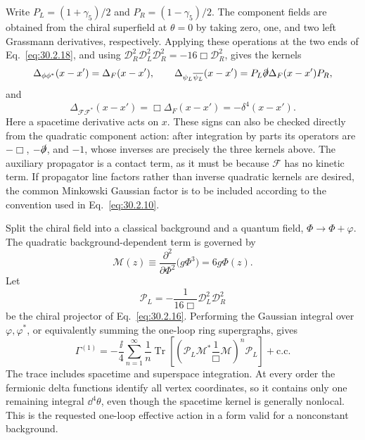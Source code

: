 \ExerciseEditorialNote

\begin{enumerate}
  Write \(P_L=(1+\gamma _5)/2\) and \(P_R=(1-\gamma _5)/2\).  The
  component fields are obtained from the chiral superfield at
  \(\theta=0\) by taking zero, one, and two left Grassmann derivatives,
  respectively.  Applying these operations at the two ends of
  Eq.~\eqref{eq:30.2.18}, and using
  \(\mathcal D_R^2\mathcal D_L^2\mathcal D_R^2
  =-16\Box\mathcal D_R^2\), gives the kernels
  \[
    \Delta_{\phi\phi^*}(x-x')=\Delta_F(x-x'),
    \qquad
    \Delta_{\psi_L\overline{\psi_L}}(x-x')
      =P_L\slashed{\partial}\Delta_F(x-x')P_R ,
  \]
  and
  \[
    \Delta_{\mathcal F\mathcal F^*}(x-x')
      =\Box\Delta_F(x-x')=-\delta^4(x-x').
  \]
  Here a spacetime derivative acts on \(x\).  These signs can also be
  checked directly from the quadratic component action: after integration
  by parts its operators are \(-\Box\), \(-\slashed{\partial}\), and
  \(-1\), whose inverses are precisely the three kernels above.  The
  auxiliary propagator is a contact term, as it must be because
  \(\mathcal F\) has no kinetic term.  If propagator line factors rather
  than inverse quadratic kernels are desired, the common Minkowski
  Gaussian factor is to be included according to the convention used in
  Eq.~\eqref{eq:30.2.10}.

  Split the chiral field into a classical background and a quantum field,
  \(\Phi\to\Phi+\varphi\).  The quadratic background-dependent term is
  governed by
  \[
    \mathcal M(z)\equiv
      \frac{\partial^2}{\partial\Phi^2}\bigl(g\Phi^3\bigr)
      =6g\Phi(z).
  \]
  Let
  \[
    \mathcal P_L=-\frac{1}{16\Box}\mathcal D_L^2\mathcal D_R^2
  \]
  be the chiral projector of Eq.~\eqref{eq:30.2.16}.  Performing the
  Gaussian integral over \(\varphi,\varphi^*\), or equivalently summing
  the one-loop ring supergraphs, gives
  \[
    \Gamma^{(1)}
      =-\frac{\ii}{4}\sum_{n=1}^{\infty}\frac1n
       \operatorname{Tr}\!
       \left[
         \left(
           \mathcal P_L\mathcal M^*\frac1{\Box}\mathcal M
         \right)^n\mathcal P_L
       \right]
       +\mathrm{c.c.}
  \]
  The trace includes spacetime and superspace integration.  At every
  order the fermionic delta functions identify all vertex coordinates,
  so it contains only one remaining integral \(\dd^4\theta\), even though
  the spacetime kernel is generally nonlocal.  This is the requested
  one-loop effective action in a form valid for a nonconstant background.


\end{enumerate}
